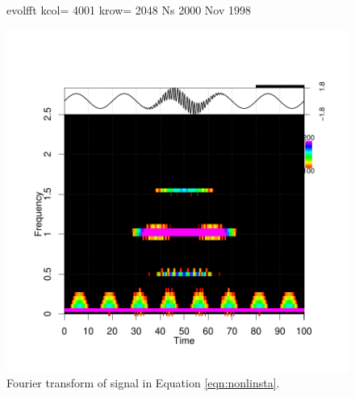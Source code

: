 \documentclass[12pt]{article}
\begin{document}
\begin{figure}[h]
\begin{center}
\begin{Schunk}
\begin{Soutput}
evolfft kcol= 4001 krow= 2048 Ns 2000 Nov 1998
\end{Soutput}
\end{Schunk}
\includegraphics{interesting_signals-nonlinstaft}
\end{center}
\caption{Fourier transform of signal in Equation \ref{eqn:nonlinsta}.}
\label{fig:nonlinstaft}
\end{figure}
\end{document}
